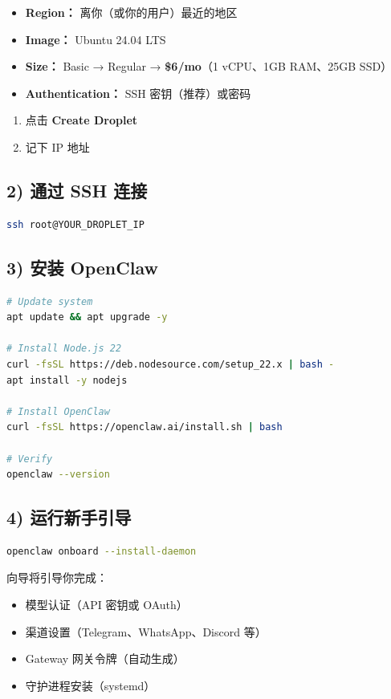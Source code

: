 \begin{itemize}
  \item \textbf{Region：} 离你（或你的用户）最近的地区
  \item \textbf{Image：} Ubuntu 24.04 LTS
  \item \textbf{Size：} Basic → Regular → \textbf{\$6/mo}（1 vCPU、1GB RAM、25GB SSD）
  \item \textbf{Authentication：} SSH 密钥（推荐）或密码
\end{itemize}

\begin{enumerate}
  \item 点击 \textbf{Create Droplet}
  \item 记下 IP 地址
\end{enumerate}


\subsection{2) 通过 SSH 连接}


\begin{lstlisting}[language=bash]
ssh root@YOUR_DROPLET_IP
\end{lstlisting}


\subsection{3) 安装 OpenClaw}


\begin{lstlisting}[language=bash]
# Update system
apt update && apt upgrade -y

# Install Node.js 22
curl -fsSL https://deb.nodesource.com/setup_22.x | bash -
apt install -y nodejs

# Install OpenClaw
curl -fsSL https://openclaw.ai/install.sh | bash

# Verify
openclaw --version
\end{lstlisting}


\subsection{4) 运行新手引导}


\begin{lstlisting}[language=bash]
openclaw onboard --install-daemon
\end{lstlisting}


向导将引导你完成：

\begin{itemize}
  \item 模型认证（API 密钥或 OAuth）
  \item 渠道设置（Telegram、WhatsApp、Discord 等）
  \item Gateway 网关令牌（自动生成）
  \item 守护进程安装（systemd）
\end{itemize}


